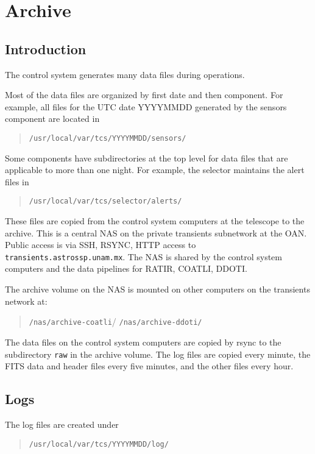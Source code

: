 \chapter{Archive}

\section{Introduction}

The control system generates many data files during operations. 

Most of the data files are organized by first date and then component. For example, all files for the UTC date YYYYMMDD generated by the sensors component are located in
\begin{quote}
\verb|/usr/local/var/tcs/YYYYMMDD/sensors/|
\end{quote}

Some components have subdirectories at the top level for data files that are applicable to more than one night. For example, the selector maintains the alert files in
\begin{quote}
\verb|/usr/local/var/tcs/selector/alerts/|
\end{quote}


These files are copied from the control system computers at the telescope to the archive. This is a central NAS on the private transients subnetwork at the OAN. Public access is via SSH, RSYNC, HTTP access to \verb|transients.astrossp.unam.mx|. The NAS is shared by the control system computers and the data pipelines for RATIR, COATLI, DDOTI.

The archive volume on the NAS is mounted on other computers on the transients network at:

\begin{quote}
\ifcoatli
\verb|/nas/archive-coatli|/
\fi
\ifddoti
\verb|/nas/archive-ddoti/|
\fi
\end{quote}

The data files on the control system computers are copied by rsync to the subdirectory \verb|raw| in the archive volume. The log files are copied every minute, the FITS data and header files every five minutes, and the other files every hour.

\section{Logs}

The log files are created under

\begin{quote}
\verb|/usr/local/var/tcs/YYYYMMDD/log/|
\end{quote}

